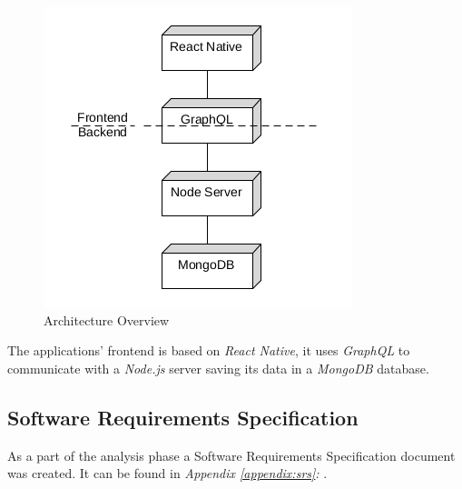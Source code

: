 \begin{figure}[H]
    \begin{center}
        \includegraphics[width=\textwidth/2]{images/overview.png}
        \caption{Architecture Overview}
        \label{fig:architecture_overview}
    \end{center}
\end{figure}

The applications' frontend is based on \textit{React Native}, it uses \textit{GraphQL} to communicate with a \textit{Node.js} server saving its data in a \textit{MongoDB} database.

\subsection{Software Requirements Specification}
\label{ssec:software_requirements_specification}

As a part of the analysis phase a Software Requirements Specification document was created. It can be found in \textit{Appendix \ref{appendix:srs}: }.
